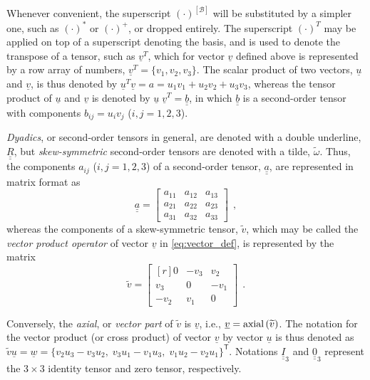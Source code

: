 \documentclass[12pt,a4paper,oneside,english]{abntex2} %
\newcommand{\vect}[1]{\underline{#1}}
\def\tens#1{\underline{\underline{#1}}}
\def\til#1{\widetilde{#1}}
\def\Ithree{\tens{I}_3}
\def\zthree{\tens{0}_3}
\begin{document}
Whenever convenient, the superscript $(\cdot{})^{[\mathcal{B}]}$ will be substituted by a simpler one, such as $(\cdot{})^{*}$ or $(\cdot{})^{+}$, or dropped entirely. The superscript $(\cdot{})^{T}$ may be applied on top of a superscript denoting the basis, and is used to denote the transpose of a tensor, such as $\vect{v}^{T}$, which for vector $\vect{v}$ defined above is represented by a row array of numbers, $\vect{v}^{T} = \{v_1, v_2, v_3\} $. The scalar product of two vectors, $\vect{u}$ and $\vect{v}$, is thus denoted by $\vect{u}^{T} \vect{v} = a = u_1 v_1 + u_2 v_2 + u_3 v_3$, whereas the tensor product of $\vect{u}$ and $\vect{v}$ is denoted by $\vect{u} \; \vect{v}^{T} = \tens{b}$, in which $\tens{b}$ is a second-order tensor with components $b_{ij} = u_i v_j$ ($i,j = 1, 2, 3$).

\textit{Dyadics}, or second-order tensors in general, are denoted with a double underline, $\tens{R}$, but \textit{skew-symmetric} second-order tensors are denoted with a tilde, $\til{\omega}$. Thus, the components $a_{ij}$ ($i,j = 1, 2, 3$) of a second-order tensor,  $\tens{a}$, are represented in matrix format as
\begin{equation}
    \tens{a} = \begin{bmatrix} 
	a_{11} & a_{12} & a_{13} \\
    a_{21} & a_{22} & a_{23} \\
    a_{31} & a_{32} & a_{33}
    \end{bmatrix} \ \ ,
    \label{eq:2nd-order-tensor_def}
\end{equation}
whereas the components of a skew-symmetric tensor, $\til{v}$, which may be called the \textit{vector product operator} of vector $\vect{v}$ in \cref{eq:vector_def}, is represented by the matrix
\begin{equation}
    \til{v} = \begin{bmatrix*}[r]       
	0 & -v_3 & v_2 \\
    v_3 & 0 & -v_1 \\
    -v_2 & v_1 & 0
    \end{bmatrix*} \ \ .
    \label{eq:skew-sym_def}
\end{equation}

Conversely, the \textit{axial}, or \textit{vector part} of $\til{v}$ is $\vect{v}$, i.e., $\vect{v} = \textnormal{axial}\left(\til{v}\right)$. The notation for the vector product (or cross product) of vector $\vect{v}$ by vector $\vect{u}$ is thus denoted as $\til{v}\vect{u} = \vect{w} = \{v_2u_3-v_3u_2,\; v_3u_1-v_1u_3,\; v_1u_2-v_2u_1\}^\mathsf{T}$. Notations $\Ithree$ and $\zthree$ represent the $3 \times 3$ identity tensor and zero tensor, respectively. 
\end{document}
